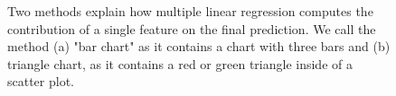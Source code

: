 \documentclass[conference]{IEEEtran}
\begin{document}
\begin{figure}[htbp]
    \centering
    \label{fig:explain}
    
    \caption{Two methods explain how multiple linear regression computes the contribution of a single feature on the final prediction. We call the method (a) "bar chart" as it contains a chart with three bars and (b) triangle chart, as it contains a red or green triangle inside of a scatter plot.}
\end{figure}
\end{document}
